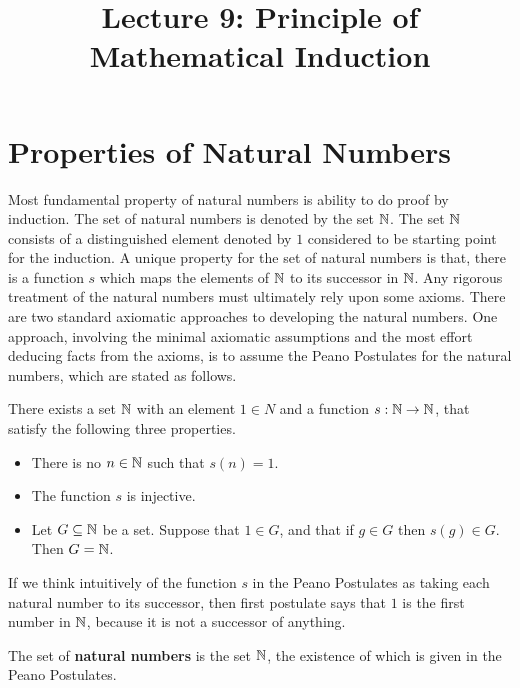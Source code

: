 \documentclass[a4paper,english,12pt]{article}
\title{Lecture 9: Principle of Mathematical Induction}
\author{}
\begin{document}
\maketitle
\section{Properties of Natural Numbers}
Most fundamental property of natural numbers is ability to do proof by induction. 
The set of natural numbers is denoted by the set $\mathbb{N}$. The set $\mathbb{N}$ consists of a distinguished element denoted by $1$ considered to be starting point for the induction. A unique property for the set of natural numbers is that, there is a function $s$ which maps the elements of $\mathbb{N}$ to its successor in $\mathbb{N}$. Any rigorous treatment of the natural numbers must ultimately rely upon some axioms. There are two standard axiomatic approaches to developing the natural numbers. One approach, involving the minimal axiomatic assumptions and the most effort deducing facts from the axioms, is to assume the Peano Postulates for the natural numbers, which are stated as follows.

\begin{axiom} There exists a set $\mathbb{N}$ with an element $1\in N$ and a function $s:\mathbb{N}\to \mathbb{N}$, that satisfy the following three properties.
\begin{itemize}
	\item There is no $n \in \mathbb{N}$ such that $s(n)=1$.
	\item The function $s$ is injective.
	\item Let $G \subseteq \mathbb{N}$ be a set. Suppose that $1 \in G$, and that if $g \in G$ then $s(g) \in G$. Then $G=\mathbb{N}$.
\end{itemize}
\end{axiom}

If we think intuitively of the function $s$ in the Peano Postulates as taking each natural number to its successor, then first postulate says that $1$ is the first number in $\mathbb{N}$, because it is not a successor of anything.

\begin{defn} The set of {\bf natural numbers} is the set $\mathbb{N}$, the existence of which is given in the Peano Postulates.
\end{defn}
\end{document}
